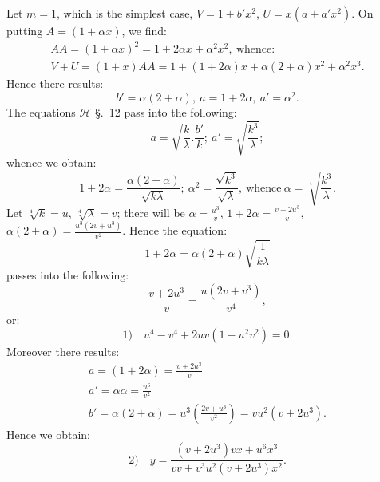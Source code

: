\documentclass{article}
\begin{document}
Let $m=1$, which is the simplest case, $V=1+b'x^{2}$, $U=x(a+a'x^{2})$. On putting $A=(1+\alpha x)$, we find:
\[
\begin{gathered}
AA=(1+\alpha x)^{2}=1+2\alpha x+\alpha^{2}x^{2},\ \text{whence:}\\
V+U=(1+x)AA=1+(1+2\alpha)x+\alpha(2+\alpha)x^{2}+\alpha^{2}x^{3}.
\end{gathered}
\]
Hence there results:
\[
b'=\alpha(2+\alpha),\ a=1+2\alpha,\ a'=\alpha^{2}.
\]
The equations $\mathcal{H}$ §.\ 12 pass into the following:
\[
a=\sqrt{\frac{k}{\lambda}}.\frac{b'}{k};\ a'=\sqrt{\frac{k^{3}}{\lambda}};
\]
whence we obtain:
\[
1+2\alpha=\frac{\alpha(2+\alpha)}{\sqrt{k\lambda}};\ \alpha^{2}=\frac{\sqrt{k^{3}}}{\sqrt{\lambda}},\ \text{whence}\ \alpha=\sqrt[4]{\frac{k^{3}}{\lambda}}.
\]
Let $\sqrt[4]{k}=u$, $\sqrt[4]{\lambda}=v$; there will be $\alpha=\frac{u^{3}}{v}$, $1+2\alpha=\frac{v+2u^{3}}{v}$, $\alpha(2+\alpha)=\frac{u^{3}(2v+u^{3})}{v^{2}}$. Hence the equation:
\[
1+2\alpha=\alpha(2+\alpha)\sqrt{\frac{1}{k\lambda}}
\]
passes into the following:
\[
\frac{v+2u^{3}}{v}=\frac{u(2v+v^{3})}{v^{4}},
\]
or:
\[
\text{1)}\quad u^{4}-v^{4}+2uv(1-u^{2}v^{2})=0.
\]
Moreover there results:
\[
\begin{gathered}
a=(1+2\alpha)=\frac{v+2u^{3}}{v}\\
a'=\alpha\alpha=\frac{u^{6}}{v^{2}}\\
b'=\alpha(2+\alpha)=u^{3}\left(\frac{2v+u^{3}}{v^{2}}\right)=vu^{2}(v+2u^{3}).
\end{gathered}
\]
Hence we obtain:
\[
\text{2)}\quad y=\frac{(v+2u^{3})vx+u^{6}x^{3}}{vv+v^{3}u^{2}(v+2u^{3})x^{2}}.
\]

\end{document}
